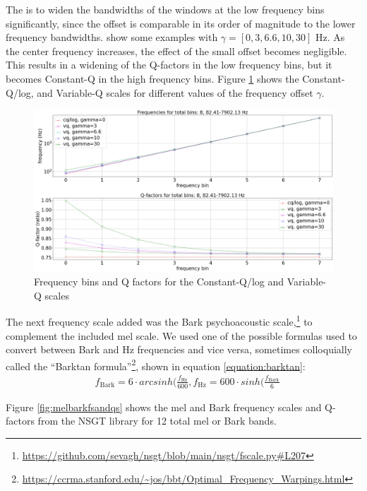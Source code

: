 \documentclass[report.tex]{subfiles}
\begin{document}
The is to widen the bandwidths of the windows at the low frequency bins significantly, since the offset is comparable in its order of magnitude to the lower frequency bandwidths. \textcite{variableq1} show some examples with $\gamma = [0, 3, 6.6, 10, 30] \text{ Hz}$. As the center frequency increases, the effect of the small offset becomes negligible. This results in a widening of the Q-factors in the low frequency bins, but it becomes Constant-Q in the high frequency bins. Figure \ref{fig:vq} shows the Constant-Q/log, and Variable-Q scales for different values of the frequency offset $\gamma$.

\begin{figure}[ht]
	\centering
	\includegraphics[width=\textwidth]{./images-freqscales/vqlog.png}
	\caption{Frequency bins and Q factors for the Constant-Q/log and Variable-Q scales}
	\label{fig:vq}
\end{figure}

The next frequency scale added was the Bark psychoacoustic scale,\footnote{\url{https://github.com/sevagh/nsgt/blob/main/nsgt/fscale.py\#L207}} to complement the included mel scale. We used one of the possible formulas used to convert between Bark and Hz frequencies \parencite{barktan} and vice versa, sometimes colloquially called the ``Barktan formula''\footnote{\url{https://ccrma.stanford.edu/~jos/bbt/Optimal_Frequency_Warpings.html}}, shown in equation \eqref{equation:barktan}:
\begin{align}\tag{26}\label{equation:barktan}
	\nonumber & f_{\text{Bark}} = 6 \cdot arcsinh(\frac{f_{\text{Hz}}}{600}, f_{\text{Hz}} = 600 \cdot sinh(\frac{f_{\text{Bark}}}{6}
\end{align}

Figure \ref{fig:melbarkfsandqs} shows the mel and Bark frequency scales and Q-factors from the NSGT library for 12 total mel or Bark bands.
\end{document}
